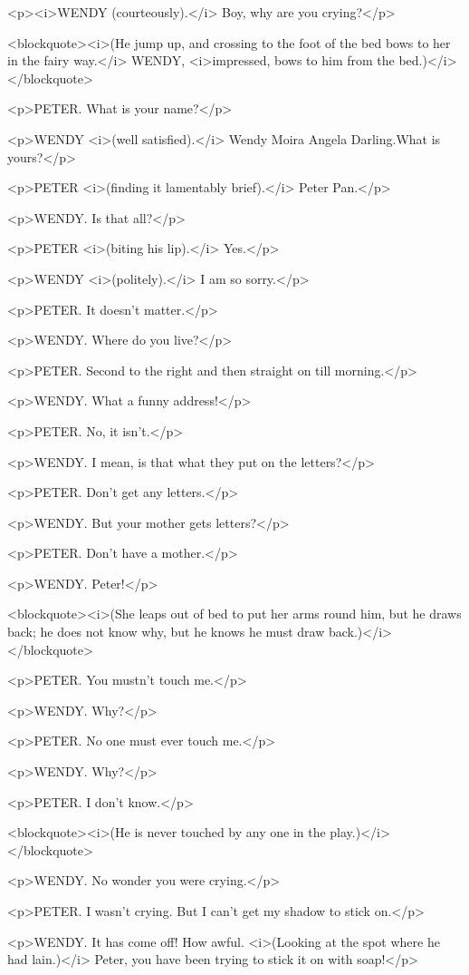 <p><i>WENDY (courteously).</i> Boy, why are you crying?</p>

<blockquote><i>(He jump up, and crossing to the foot of the bed bows to her in the fairy way.</i> WENDY, <i>impressed, bows to him from the bed.)</i></blockquote>

<p>PETER. What is your name?</p>

<p>WENDY <i>(well satisfied).</i> Wendy Moira Angela Darling.What is yours?</p>

<p>PETER <i>(finding it lamentably brief).</i> Peter Pan.</p>

<p>WENDY. Is that all?</p>

<p>PETER <i>(biting his lip).</i> Yes.</p>

<p>WENDY <i>(politely).</i> I am so sorry.</p>

<p>PETER. It doesn't matter.</p>

<p>WENDY. Where do you live?</p>

<p>PETER. Second to the right and then straight on till morning.</p>

<p>WENDY. What a funny address!</p>

<p>PETER. No, it isn't.</p>

<p>WENDY. I mean, is that what they put on the letters?</p>

<p>PETER. Don't get any letters.</p>

<p>WENDY. But your mother gets letters?</p>

<p>PETER. Don't have a mother.</p>

<p>WENDY. Peter!</p>

<blockquote><i>(She leaps out of bed to put her arms round him, but he draws back; he does not know why, but he knows he must draw back.)</i></blockquote>

<p>PETER. You mustn't touch me.</p>

<p>WENDY. Why?</p>

<p>PETER. No one must ever touch me.</p>

<p>WENDY. Why?</p>

<p>PETER. I don't know.</p>

<blockquote><i>(He is never touched by any one in the play.)</i></blockquote>

<p>WENDY. No wonder you were crying.</p>

<p>PETER. I wasn't crying. But I can't get my shadow to stick on.</p>

<p>WENDY. It has come off! How awful. <i>(Looking at the spot where he had lain.)</i> Peter, you have been trying to stick it on with soap!</p>

